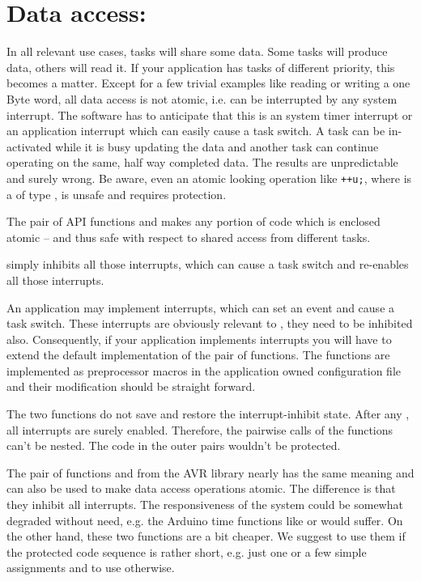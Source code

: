 \section{Data access: }
\label{secEnterLeaveCritSec}

In all relevant use cases, tasks will share some data. Some tasks will
produce data, others will read it. If your application has tasks of
different priority, this becomes a matter. Except for a few trivial
examples like reading or writing a one Byte word, all data access is not
atomic, i.e. can be interrupted by any system interrupt. The software has
to anticipate that this is an \rtos{} system timer interrupt or an
application interrupt which can easily cause a task switch. A task can be
in-activated while it is busy updating the data and another task can
continue operating on the same, half way completed data. The results are
unpredictable and surely wrong. Be aware, even an atomic looking operation
like \verb$++u;$, where  is a of type , is unsafe
and requires protection.

The pair of API functions  and
 makes any portion of code which is
enclosed atomic -- and thus safe with respect to shared access from
different tasks.

 simply inhibits all those interrupts,
which can cause a task switch and 
re-enables all those interrupts.

An application may implement interrupts, which can set an \rtos{} event
and cause a task switch. These interrupts are obviously relevant to
, they need to be inhibited also.
Consequently, if your application implements interrupts you will have to
extend the default implementation of the pair of functions. The functions
are implemented as preprocessor macros in the application owned \rtos{}
configuration file  and their modification should be
straight forward.

The two functions do not save and restore the interrupt-inhibit state.
After any , all interrupts are
surely enabled. Therefore, the pairwise calls of the functions can't be
nested. The code in the outer pairs wouldn't be protected.

The pair of functions  and  from the AVR library
nearly has the same meaning and can also be used to make data access
operations atomic. The difference is that they inhibit all interrupts. The
responsiveness of the system could be somewhat degraded without need, e.g.
the Arduino time functions like  or  would
suffer. On the other hand, these two functions are a bit cheaper. We
suggest to use them if the protected code sequence is rather short, e.g.
just one or a few simple assignments and to use
 otherwise.

